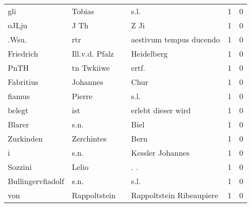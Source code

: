 \begin{tabular}{llllrr}
                      gli &                             Tobias &             &                                        s.l. &          1 &         0 \\
                    oJLju &                               J Th &             &                                        Z Ji &          1 &         0 \\
                    .Wsu. &                                rtr &             &                     aestivum tempus ducendo &          1 &         0 \\
                Friedrich &                     Ill.v.d. Pfalz &             &                                  Heidelberg &          1 &         0 \\
                     PnTH &                         tn Twkiiwe &             &                                      ertf.  &          1 &         0 \\
                Fabritius &                           Johannes &             &                                        Chur &          1 &         0 \\
                   fiamus &                             Pierre &             &                                        s.l. &          1 &         0 \\
                   belegt &                                ist &             &                          erlebt dieser wird &          1 &         0 \\
                   Blarer &                               s.n. &             &                                        Biel &          1 &         0 \\
                Zurkinden &                         Zerchintes &             &                                        Bern &          1 &         0 \\
                        i &                               s.n. &             &                            Kessler Johannes &          1 &         0 \\
                  Sozzini &                              Lelio &             &                                        . .  &          1 &         0 \\
        Bullingervfiadolf &                               s.n. &             &                                        s.l. &          1 &         0 \\
                      von &                       Rappoltstein &             &                    Rappoltstein Ribeaupiere &          1 &         0 \\

\end{tabular}

